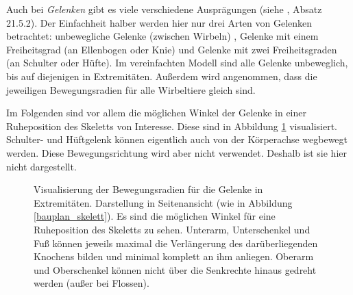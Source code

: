 Auch bei \emph{Gelenken} gibt es viele verschiedene Ausprägungen (siehe \cite{Vergleichende_Anatomie}, Absatz 21.5.2). Der Einfachheit halber werden hier nur drei Arten von Gelenken betrachtet: unbewegliche Gelenke (\zb zwischen Wirbeln) , Gelenke mit einem Freiheitsgrad (\zb an Ellenbogen oder Knie) und Gelenke mit zwei Freiheitsgraden (\zb an Schulter oder Hüfte).
Im vereinfachten Modell sind alle Gelenke unbeweglich, bis auf diejenigen in Extremitäten. Außerdem wird angenommen, dass die jeweiligen Bewegungsradien für alle Wirbeltiere gleich sind. 

Im Folgenden sind vor allem die möglichen Winkel der Gelenke in einer Ruheposition des Skeletts von Interesse. Diese sind in Abbildung \ref{joints} visualisiert.  Schulter- und Hüftgelenk können eigentlich auch von der Körperachse wegbewegt werden. Diese Bewegungsrichtung wird aber nicht verwendet. Deshalb ist sie hier nicht dargestellt.

\begin{figure}
  \qquad
  
  \caption{Visualisierung der Bewegungsradien für die Gelenke in Extremitäten. Darstellung in Seitenansicht (wie in Abbildung \ref{bauplan_skelett}). Es sind die möglichen Winkel für eine Ruheposition des Skeletts zu sehen. Unterarm, Unterschenkel und Fuß können jeweils maximal die Verlängerung des darüberliegenden Knochens bilden und minimal komplett an ihm anliegen. Oberarm und Oberschenkel können nicht über die Senkrechte hinaus gedreht werden (außer bei Flossen).}
  \label{joints}
 \end{figure}


